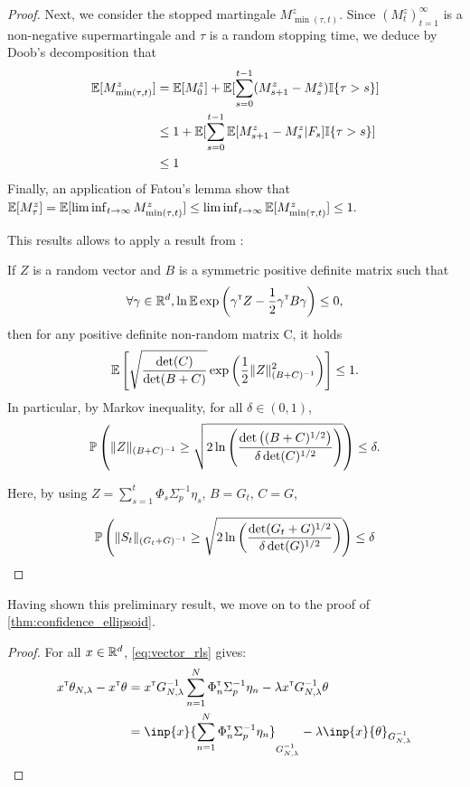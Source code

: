 \begin{subappendices}
\begin{proof}
		Next, we consider the stopped martingale $M_{\min(\tau,t)}^z$. Since 
		$(M_t^z)_{t=1}^\infty$ is a non-negative supermartingale and $\tau$ is a random stopping time, we deduce by Doob's decomposition that
		\begin{align*}
		\operatorname*{\mathbb{E}}[M_{\min(\tau,t)}^z] &= \operatorname*{\mathbb{E}}[M_0^z] + \operatorname*{\mathbb{E}}[\sum_{s=0}^{t-1} (M_{s+1}^z-M_s^z) \mathbb{I}\{\tau>s\}]\\
		&\leq 1 + \operatorname*{\mathbb{E}}[\sum_{s=0}^{t-1} \operatorname*{\mathbb{E}}[M_{s+1}^z-M_s^z|F_{s}] \mathbb{I}\{\tau>s\}]\\
		&\leq 1
		\end{align*}
		Finally, an application of Fatou's lemma show that 
		$\operatorname*{\mathbb{E}}[M_\tau^z] = \operatorname*{\mathbb{E}}[\liminf_{t\to\infty} M_{\min(\tau,t)}^z] \leq \liminf_{t\to\infty} \operatorname*{\mathbb{E}}[M_{\min(\tau,t)}^z] \leq 1.$
		
		This results allows to apply a result from \citep{pena2008self}:
		\begin{lemma}
			If $Z$ is a random vector and $B$ is a symmetric positive definite matrix such that
			\[\forall \gamma\in\mathbb{R}^d, \ln \operatorname*{\mathbb{E}} \exp \left(\gamma^{\mathsf{\scriptscriptstyle T}} Z -\frac{1}{2} \gamma^{\mathsf{\scriptscriptstyle T}} B \gamma \right)\leq 0,\]
			then for any positive definite non-random matrix C, it holds
			\[\operatorname*{\mathbb{E}}\left[ \sqrt{\frac{\det(C)}{\det(B+C)} } \exp\left( \frac{1}{2}\|Z\|^2_{(B+C)^{-1}}\right)\right]\leq 1. \] 
			In particular, by Markov inequality, for all $\delta\in(0,1)$, 
			\[\mathbb{P}\left(\|Z\|_{(B+C)^{-1}} \geq \sqrt{2\ln \left(\frac{\det \left((B+C)^{1/2}\right)}{\delta\det(C)^{1/2}}\right)}\right)\leq \delta.\]
		\end{lemma}
		
		Here, by using $Z = \sum_{s=1}^t\Phi_s\Sigma_p^{-1}\eta_s$, $B=G_t$, $C=G$,
		
		\[
		\mathbb{P}\left(\| S_t \|_{(G_t+G)^{-1}} \geq \sqrt{2\ln \left(\frac{\det(G_t+G)^{1/2}}{\delta\det(G)^{1/2}}\right)}\right) \leq \delta
		\]
		
	\end{proof}
	
	Having shown this preliminary result, we move on to the proof of \autoref{thm:confidence_ellipsoid}.
	
	\begin{proof}
		For all $x\in\mathbb{R}^d$, \eqref{eq:vector_rls} gives:
		\begin{align*}
		x^\transp\theta_{N,\lambda}  -x^\transp\theta &= x^\transp G_{N, \lambda}^{-1}\sum_{n=1}^N \Phi_n^\transp \Sigma_p^{-1}\eta_n
		- \lambda x^\transp G_{N, \lambda}^{-1}\theta\\
		&= \inp{x}{\sum_{n=1}^N \Phi_n^\transp \Sigma_p^{-1}\eta_n}_{G_{N, \lambda}^{-1}} - \lambda\inp{x}{\theta}_{G_{N, \lambda}^{-1}}
		\end{align*}
		

\end{proof}
\end{subappendices}
